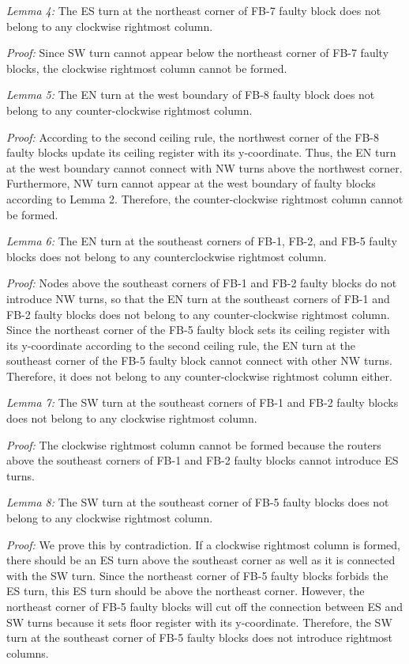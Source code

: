 \textit{Lemma 4:} The ES turn at the northeast corner of FB-7 faulty block does not belong to any clockwise rightmost column.

\textit{Proof:} Since SW turn cannot appear below the northeast corner of FB-7 faulty blocks, the clockwise rightmost column cannot be formed.

\textit{Lemma 5:} The EN turn at the west boundary of FB-8 faulty block does not belong to any counter-clockwise rightmost column.

\textit{Proof:} According to the second ceiling rule, the northwest corner of the FB-8 faulty blocks update its ceiling register with its y-coordinate. Thus, the EN turn at the west boundary cannot connect with NW turns above the northwest corner. Furthermore, NW turn cannot appear at the west boundary of faulty blocks according to Lemma 2. Therefore, the counter-clockwise rightmost column cannot be formed.

\textit{Lemma 6:} The EN turn at the southeast corners of FB-1, FB-2, and FB-5 faulty blocks does not belong to any counterclockwise rightmost column.

\textit{Proof:} Nodes above the southeast corners of FB-1 and FB-2 faulty blocks do not introduce NW turns, so that the EN turn at the southeast corners of FB-1 and FB-2 faulty blocks does not belong to any counter-clockwise rightmost column. Since the northeast corner of the FB-5 faulty block sets its ceiling register with its y-coordinate according to the second ceiling rule, the EN turn at the southeast corner of the FB-5 faulty block cannot connect with other NW turns. Therefore, it does not belong to any counter-clockwise rightmost column either.

\textit{Lemma 7:} The SW turn at the southeast corners of FB-1 and FB-2 faulty blocks does not belong to any clockwise rightmost column.

\textit{Proof:} The clockwise rightmost column cannot be formed because the routers above the southeast corners of FB-1 and FB-2 faulty blocks cannot introduce ES turns.

\textit{Lemma 8:} The SW turn at the southeast corner of FB-5 faulty blocks does not belong to any clockwise rightmost column.

\textit{Proof:} We prove this by contradiction. If a clockwise rightmost column is formed, there should be an ES turn above the southeast corner as well as it is connected with the SW turn. Since the northeast corner of FB-5 faulty blocks forbids the ES turn, this ES turn should be above the northeast corner. However, the northeast corner of FB-5 faulty blocks will cut off the connection between ES and SW turns because it sets floor register with its y-coordinate. Therefore, the SW turn at the southeast corner of FB-5 faulty blocks does not introduce rightmost columns.

